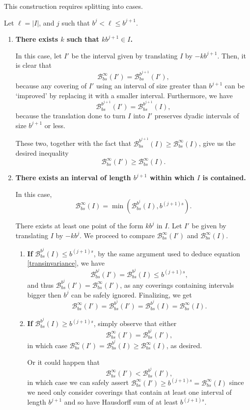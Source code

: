 \documentclass[11pt, reqno]{amsart}
\newcommand{\BB}{\mathcal{B}}
\begin{document}
This construction requires splitting into cases.

Let $\ell = \lvert I \rvert$, and $j$ such that $b^j < \ell \leq b^{j+1}$.

\begin{enumerate}[label=\textbf{Case \arabic*:}]

\item \textbf{There exists $k$ such that $k b^{j+1} \in I$.}

In this case, let $I'$ be the interval given by translating $I$ by $-k b^{j+1}$. Then, it is clear that
\[\BB_{bs}^\infty(I') = \BB_{bs}^{b^{j+1}}(I'),\]
because any covering of $I'$ using an interval of size greater than $b^{j+1}$ can be `improved' by replacing it with a smaller interval. Furthermore, we have
\begin{equation}\label{transinvariance}
\BB_{bs}^{b^{j+1}}(I') = \BB_{bs}^{b^{j+1}}(I),
\end{equation}
because the translation done to turn $I$ into $I'$ preserves dyadic intervals of size $b^{j+1}$ or less.

These two, together with the fact that $\BB_{bs}^{b^{j+1}}(I) \geq \BB_{bs}^\infty(I)$, give us the desired inequality
\[\BB_{bs}^\infty(I') \geq \BB_{bs}^\infty(I).\]

\item \textbf{There exists an interval of length $b^{j+1}$ within which $I$ is contained.}

In this case, 
\[\BB_{bs}^\infty(I) = \min(\BB_{bs}^{b^j}(I), b^{(j+1)s}).\]

There exists at least one point of the form $k b^j$ in $I$. Let $I'$ be given by translating $I$ by $-k b^j$. We proceed to compare $\BB_{bs}^\infty(I')$ and $\BB_{bs}^\infty(I)$.

\begin{enumerate}[label=\textbf{Subcase \alph*:}]

\item \textbf{If} $\BB_{bs}^{b^j}(I) \leq b^{(j+1)s}$, by the same argument used to deduce equation \eqref{transinvariance}, we have
\[\BB_{bs}^{b^j}(I') = \BB_{bs}^{b^j}(I) \leq b^{(j+1)s},\]
and thus $\BB_{bs}^{b^j}(I') = \BB_{bs}^\infty(I')$, as any coverings containing intervals bigger then $b^j$ can be safely ignored. Finalizing, we get
\[\BB_{bs}^\infty(I') = \BB_{bs}^{b^j}(I') = \BB_{bs}^{b^j}(I) = \BB_{bs}^\infty(I).\]

\item \textbf{If} $\BB_{bs}^{b^j}(I) \geq b^{(j+1)s}$, simply observe that either
\[\BB_{bs}^\infty(I') = \BB_{bs}^{b^j}(I'),\]
in which case $\BB_{bs}^\infty(I') = \BB_{bs}^{b^j}(I) \geq \BB_{bs}^\infty(I)$, as desired.

Or it could happen that
\[\BB_{bs}^\infty(I') < \BB_{bs}^{b^j}(I'),\]
in which case we can safely assert $\BB_{bs}^\infty(I') \geq b^{(j+1)s} = \BB_{bs}^\infty(I)$ since we need only consider coverings that contain at least one interval of length $b^{j+1}$ and so have Hausdorff sum of at least $b^{(j+1)s}$.
\end{enumerate}
\end{enumerate}
\end{document}

